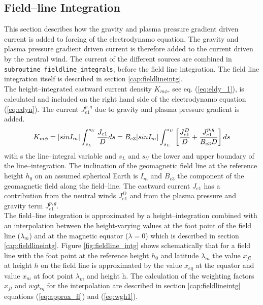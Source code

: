 \subsection{Field--line Integration}\label{subsubsec:field--line-intg}
%
This section describes how the gravity and plasma pressure gradient driven current
is added to forcing of the electrodynamo equation. The gravity and plasma pressure 
gradient driven current is therefore added to the current driven by the neutral wind.
The current of the different sources are combined
in \texttt{subroutine fieldline\_integrals}, before the field line integration.
The field line integration itself is described in section \ref{cap:fieldlineintg}. \\
%
The height--integrated
eastward current density $K_{m\phi}$, see eq. (\ref{eq:eldy_1}),
is calculated and included on the right hand side
of the electrodynamo equation (\ref{eq:edyn}). The current $J_{e1}^{p,g}$ 
due to gravity and plasma
pressure gradient is added.
%
\begin{equation}
  K_{m\phi} = |sin I_m | \int_{s_L}^{s_U} \frac{{J}_{e1}}{D} ds  = \\
  B_{e3} |sin I_m | \int_{s_L}^{s_U} \left[ \frac{{J}_{e1}^D}{D} +
              \frac{{J}_{e1}^{p,g}}{B_{e3} D}  \right] ds\label{eq:int_kqp}
\end{equation}
%
with s the line--integral variable and ${s_L}$ and ${s_U}$ the lower and upper boundary
of the line--integration. The inclination of the geomagnetic field line at the
reference height $h_0$ on an assumed spherical Earth is $I_m$ and $B_{e3}$ the
component of the geomagnetic field along the field--line. The eastward current
${J}_{e1}$ has a contribution from the neutral winds ${J}_{e1}^D$ and from the
plasma pressure and gravity term ${J}_{e1}^{p,g}$. \\
%
The field--line integration is approximated by a height--integration 
combined with an interpolation
between the height-varying values at the foot point of the field line 
($\lambda_m$) and at the magnetic 
equator ($\lambda = 0$) which is described in section \ref{cap:fieldlineintg}. 
Figure \ref{fig:fieldline_intg} shows schematically that for
a field line with the foot point at the reference height $h_0$ and latitude $\lambda_m$ the
value $x_{fl}$ at height $h$ on the field line is approximated by the value $x_{eq}$ at the equator
and value $x_m$ at foot point $\lambda_m$ and height h. The calculation of the weighting factors $x_{fl}$
and $wgt_{eq}$ for the interpolation are described in section \ref{cap:fieldlineintg} equations 
(\ref{eq:approx_fl}) and (\ref{eq:wgh1}).

